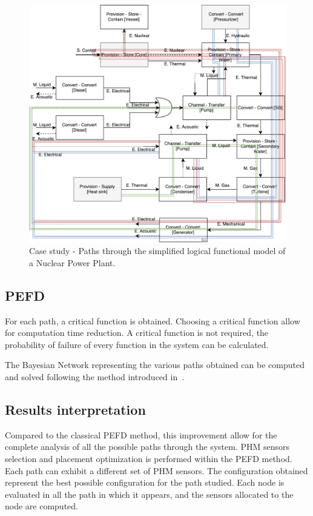 \begin{figure}[t]
\centering
\includegraphics[scale=.65]{fig/Function_model_plus}
\caption{Case study - Paths through the simplified logical functional model of a Nuclear Power Plant.}
\label{fig:case_fm_path}
\end{figure}

\subsection{PEFD}

For each path, a critical function is obtained. Choosing a critical function allow for computation time reduction. A critical function is not required, the probability of failure of every function in the system can be calculated.

The Bayesian Network representing the various paths obtained can be computed and solved following the method introduced in~\cite{lher2016}.

\subsection{Results interpretation}

Compared to the classical PEFD method, this improvement allow for the complete analysis of all the possible paths through the system. PHM sensors selection and placement optimization is performed within the PEFD method. Each path can exhibit a different set of PHM sensors. The configuration obtained represent the best possible configuration for the path studied. Each node is evaluated in all the path in which it appears, and the sensors allocated to the node are computed.

